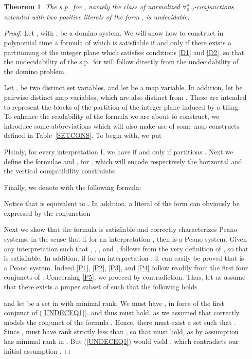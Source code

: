 \documentclass[submission,copyright,creativecommons]{eptcs}
\newtheorem{theorem}{Theorem}
\newcommand{\Lang}{\ensuremath{\mathbf{\forall}^{\pi}_{0,2}}\xspace}
\newcommand{\inter}{I}
\begin{document}
\begin{theorem}\label{PEANUNDEC}
The s.p.\ for , namely the class of normalized
\Lang-conjunctions extended with two positive literals of the form , is undecidable.
\end{theorem}
\begin{proof}
Let , with , be a
domino system.  We will show how to construct in polynomial time a
formula  of  which is satisfiable if and only
if there exists a partitioning of the integer plane which satisfies
conditions \ref{D1} and \ref{D2}, so that the undecidability of the
s.p.\ for  will follow directly from the undecidability
of the domino problem.

Let ,  be two distinct set variables, and let  be a map
variable.  In addition, let  be pairwise
distinct map variables, which are also distinct from .  These are
intended to represent the blocks of the partition of the integer plane
induced by a tiling.
To enhance the readability of the formula  we are about to
construct, we introduce some abbreviations which will also make use 
of some map constructs defined in Table~\ref{SETCONS}. 
To begin with, we put

Plainly, for every interpretation \inter, we have  if and only if
 partitions .
Next we define the formulae  and , for , which will encode respectively the horizontal and the
vertical compatibility constraints:

Finally, we denote with  the following formula:

Notice that  is equivalent to
.  In addition, a literal of
the form  can obviously be expressed by the conjunction



Next we show that the formula  is
satisfiable and correctly characterizes Peano systems, in the sense
that if  for an interpretation
, then  is a
Peano system.
Given any interpretation  such that ,
, , and ,  follows
from the very definition of , so that
 is satisfiable.
In addition, if  for an
interpretation , it can easily be proved that  is a Peano system.  Indeed \ref{P1},
\ref{P2}, \ref{P3}, and \ref{P4} follow readily from the first four
conjuncts of .  
Concerning \ref{P5}, we proceed by contradiction.
Thus, let us assume that there exists a proper subset  of  such that the following holds

and let  be a set in  with minimal rank.
We must have , in force of the first conjunct of
(\ref{UNDECEQ1}), and thus  must hold, as
we assumed that  correctly models the conjunct  of the formula .
Hence, there must exist a set  such that .  Since ,  must have rank strictly less than , so that
 must hold, as by assumption  has minimal rank in
.  But (\ref{UNDECEQ1}) would yield ,
which contradicts our initial assumption .




\end{proof}
\end{document}
